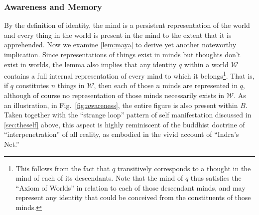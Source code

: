 \documentclass[pra,twocolumn,groupedaddress,10pt]{revtex4}
\theoremstyle{definition}
\begin{document}
\subsubsection{Awareness and Memory} \label{sec:awamem}

By the definition of identity, the mind is a persistent representation of the world and every thing in the world is present in the mind to the extent that it is apprehended. Now we examine \autoref{lem:maya} to derive yet another noteworthy implication. Since representations of things exist in minds but thoughts don't exist in worlds, the lemma also implies that any identity $q$ within a world $\mathcal{W}$ contains a full internal representation of every mind to which it belongs\footnote{This follows from the fact that $q$ transitively corresponds to a thought in the mind of each of its descendants. Note that the mind of $q$ thus satisfies the ``Axiom of Worlds'' in relation to each of those descendant minds, and may represent any identity that could be conceived from the constituents of those minds.}. That is, if $q$ constitutes $n$ things in $\mathcal{W}$, then each of those $n$ minds are represented in $q$, although of course no representation of those minds necessarily exists in $\mathcal{W}$. As an illustration, in Fig.~\ref{fig:awareness}, the entire figure is also present within $B$. Taken together with the ``strange loop'' pattern of self manifestation discussed in \autoref{sec:theself} above, this aspect is highly reminiscent of the buddhist doctrine of ``interpenetration'' of all reality, as embodied in the vivid account of ``Indra's Net.''\cite{avatamsaka}
\end{document}
